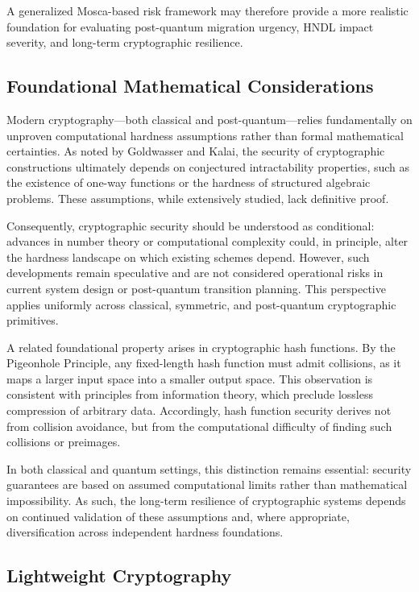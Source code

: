 \documentclass[11pt,a4paper]{article}
\begin{document}
A generalized Mosca-based risk framework may therefore provide a more realistic foundation for evaluating post-quantum migration urgency, HNDL impact severity, and long-term cryptographic resilience.
\subsection{Foundational Mathematical Considerations}

Modern cryptography—both classical and post-quantum—relies fundamentally on unproven computational hardness assumptions rather than formal mathematical certainties. As noted by Goldwasser and Kalai, the security of cryptographic constructions ultimately depends on conjectured intractability properties, such as the existence of one-way functions or the hardness of structured algebraic problems.\cite{goldwasser2016} These assumptions, while extensively studied, lack definitive proof.

Consequently, cryptographic security should be understood as conditional: advances in number theory or computational complexity could, in principle, alter the hardness landscape on which existing schemes depend. However, such developments remain speculative and are not considered operational risks in current system design or post-quantum transition planning. This perspective applies uniformly across classical, symmetric, and post-quantum cryptographic primitives.

A related foundational property arises in cryptographic hash functions. By the Pigeonhole Principle, any fixed-length hash function must admit collisions, as it maps a larger input space into a smaller output space. This observation is consistent with principles from information theory, which preclude lossless compression of arbitrary data. Accordingly, hash function security derives not from collision avoidance, but from the computational difficulty of finding such collisions or preimages.

In both classical and quantum settings, this distinction remains essential: security guarantees are based on assumed computational limits rather than mathematical impossibility. As such, the long-term resilience of cryptographic systems depends on continued validation of these assumptions and, where appropriate, diversification across independent hardness foundations.

\subsection{Lightweight Cryptography}
\end{document}
